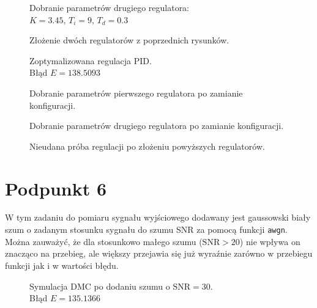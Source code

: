 \begin{figure}[ht]
\centering

\caption{Dobranie parametrów drugiego regulatora:\\
$ K=\num{3,45} $, $ T_i=\num{9} $, $ T_d=\num{0,3} $}
\label{Z5e}
\end{figure}

\begin{figure}[ht]
\centering

\caption{Złożenie dwóch regulatorów z poprzednich rysunków.}
\label{Z5f}
\end{figure}

\begin{figure}[ht]
\centering

\caption{Zoptymalizowana regulacja PID.\\Błąd $ E=138.5093 $}
\label{Z5g}
\end{figure}

\begin{figure}[ht]
\centering

\caption{Dobranie parametrów pierwszego regulatora po zamianie konfiguracji.}
\label{Z5h}
\end{figure}

\begin{figure}[ht]
\centering

\caption{Dobranie parametrów drugiego regulatora po zamianie konfiguracji.}
\label{Z5i}
\end{figure}

\begin{figure}[ht]
\centering

\caption{Nieudana próba regulacji po złożeniu powyższych regulatorów.}
\label{Z5j}
\end{figure}


\chapter{Podpunkt 6}
W tym zadaniu do pomiaru sygnału wyjściowego dodawany jest gaussowski biały szum o zadanym stosunku sygnału do szumu SNR za pomocą funkcji \verb|awgn|. Można zauważyć, że dla stosunkowo małego szumu ($ \mathrm{SNR}>20 $) nie wpływa on znacząco na przebieg, ale większy przejawia się już wyraźnie zarówno w przebiegu funkcji jak i w wartości błędu. 

\begin{figure}[ht]
\centering

\caption{Symulacja DMC po dodaniu szumu o $ \mathrm{SNR}=30 $.\\Błąd $ E = \num{135,1366} $}
\label{Z6a}
\end{figure}

